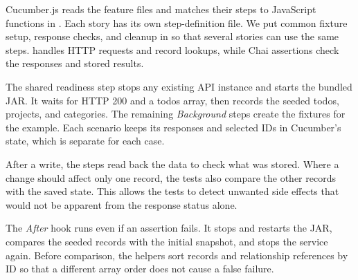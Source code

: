 Cucumber.js reads the feature files and matches their steps to JavaScript
functions in . Each story has its own step-definition file. We put
common fixture setup, response checks, and cleanup in 
so that several stories can use the same steps.  handles HTTP
requests and record lookups, while Chai assertions check the responses and stored
results.

\begin{center}
\label{fig:architecture}
\end{center}

The shared readiness step stops any existing API instance and starts the bundled
JAR. It waits for HTTP 200 and a todos array, then records the seeded todos,
projects, and categories. The remaining \textit{Background} steps create the fixtures for
the example. Each scenario keeps its responses and selected IDs in Cucumber's
 state, which is separate for each case.

After a write, the steps read back the data to check what was stored. Where a
change should affect only one record, the tests also compare the other records
with the saved state. This allows the tests to detect unwanted side effects
that would not be apparent from the response status alone.

The \textit{After} hook runs even if an assertion fails. It stops and restarts the JAR,
compares the seeded records with the initial snapshot, and stops the service
again. Before comparison, the helpers sort records and relationship references
by ID so that a different array order does not cause a false failure.

